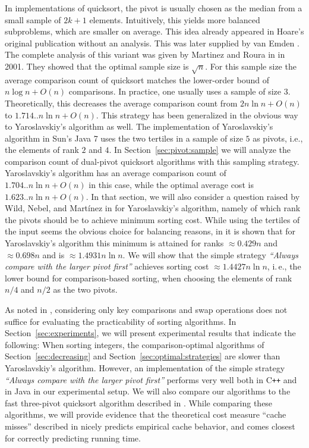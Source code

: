\documentclass[prodmode,acmtalg]{acmsmall}
\newcommand{\Cpp}{C{}\texttt{++}{}}
\begin{document}
In implementations of quicksort, the pivot is usually chosen as the median 
from a small sample of $2k + 1$ elements. Intuitively, this yields more balanced subproblems, 
which are smaller on average.
This idea already appeared in Hoare's original publication \cite{Hoare} without 
an analysis. This was later supplied by van Emden \cite{vanEmden}. The complete analysis of
this variant was given by Martinez and Roura in \cite{MartinezR01} in 2001. 
They showed that the optimal sample size is $\sqrt{n}$. For this
sample size the 
average comparison count of quicksort
matches the lower-order bound of $n \log n + O(n)$ comparisons. 
In practice, one usually uses a sample of size $3$. Theoretically, this decreases
the average comparison count from $2n \ln n + O(n)$ to $1.714..n \ln n + O(n)$.
This strategy has been generalized in the obvious way to Yaroslavskiy's
algorithm as well. The implementation of Yaroslavskiy's algorithm in Sun's Java 7 uses
the two tertiles in a sample of size $5$ as pivots, i.e., the elements of rank $2$ and $4$.
In
Section~\ref{sec:pivot:sample} we will analyze the comparison count of dual-pivot
quicksort algorithms with this sampling strategy. 
Yaroslavskiy's algorithm has an average comparison count of $1.704..n \ln n + O(n)$ 
in this case, while the optimal average cost is $1.623..n \ln n + O(n)$.
In that section, we will also consider a question raised by Wild, Nebel, and Mart\'inez
in \cite[Section 8]{WildNM14} for Yaroslavskiy's algorithm, namely of which rank the
pivots should be to achieve  minimum sorting cost. While using
the tertiles of the input 
seems the obvious choice for balancing reasons, in \cite{WildNM14} it is shown
that for Yaroslavskiy's algorithm this minimum is attained for ranks
$\approx 0.429n$ and $\approx
0.698n$ and is $\approx 1.4931 n \ln n$. We will show that the simple strategy \emph{``Always
  compare with the larger pivot first''} achieves sorting cost $\approx 1.4427 n \ln n$,
  i.\,e., the lower bound for comparison-based sorting,  when choosing the
  elements of rank $n/4$ and $n/2$ as the two pivots.

As noted in \cite{nebel13}, considering only key comparisons
and swap operations does not suffice for evaluating the practicability of
sorting algorithms. In Section~\ref{sec:experiments}, we will present
experimental results that indicate the following: When sorting integers, the
comparison-optimal algorithms of Section~\ref{sec:decreasing} and
Section~\ref{sec:optimal:strategies} are slower than Yaroslavskiy's
algorithm. However, an implementation of the simple strategy \emph{``Always compare
with the larger pivot first''} performs very well both in {\Cpp} and in Java in
our experimental setup.  We will also compare our algorithms to the fast
three-pivot quicksort algorithm described in \cite{Kushagra14}.
While comparing these algorithms, we will provide evidence that the theoretical cost measure ``cache misses'' 
described in \cite{Kushagra14} nicely predicts empirical cache behavior,
and comes closest for correctly predicting running time.
\end{document}
